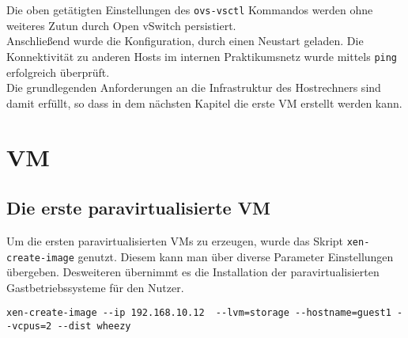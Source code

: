 Die oben getätigten Einstellungen des \verb#ovs-vsctl# Kommandos werden ohne weiteres Zutun durch Open vSwitch persistiert.
\\
Anschließend wurde die Konfiguration, durch einen Neustart geladen. Die Konnektivität zu anderen Hosts im internen Praktikumsnetz wurde mittels \verb#ping# erfolgreich überprüft.
\\
Die grundlegenden Anforderungen an die Infrastruktur des Hostrechners sind damit erfüllt, so dass in dem nächsten Kapitel die erste VM erstellt werden kann.

\chapter{VM}


\section{Die erste paravirtualisierte VM}
Um die ersten paravirtualisierten VMs zu erzeugen, wurde das Skript \verb#xen-create-image# genutzt. Diesem kann man über diverse Parameter Einstellungen übergeben. Desweiteren übernimmt es die Installation der paravirtualisierten Gastbetriebssysteme für den Nutzer.
\begin{verbatim}
xen-create-image --ip 192.168.10.12  --lvm=storage --hostname=guest1 --vcpus=2 --dist wheezy
\end{verbatim}
\setupVerbatimOut
